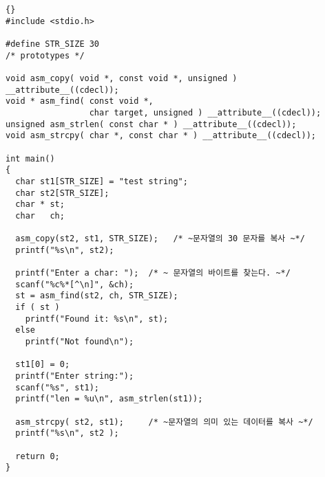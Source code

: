 \begin{lstlisting}[escapeinside=~~]{}
#include <stdio.h>

#define STR_SIZE 30
/* prototypes */

void asm_copy( void *, const void *, unsigned ) __attribute__((cdecl));
void * asm_find( const void *, 
                 char target, unsigned ) __attribute__((cdecl));
unsigned asm_strlen( const char * ) __attribute__((cdecl));
void asm_strcpy( char *, const char * ) __attribute__((cdecl));

int main()
{
  char st1[STR_SIZE] = "test string";
  char st2[STR_SIZE];
  char * st;
  char   ch;

  asm_copy(st2, st1, STR_SIZE);   /* ~문자열의 30 문자를 복사 ~*/
  printf("%s\n", st2);

  printf("Enter a char: ");  /* ~ 문자열의 바이트를 찾는다. ~*/
  scanf("%c%*[^\n]", &ch);
  st = asm_find(st2, ch, STR_SIZE);
  if ( st )
    printf("Found it: %s\n", st);
  else
    printf("Not found\n");

  st1[0] = 0;
  printf("Enter string:");
  scanf("%s", st1);
  printf("len = %u\n", asm_strlen(st1));

  asm_strcpy( st2, st1);     /* ~문자열의 의미 있는 데이터를 복사 ~*/
  printf("%s\n", st2 );

  return 0;
}
\end{lstlisting}














